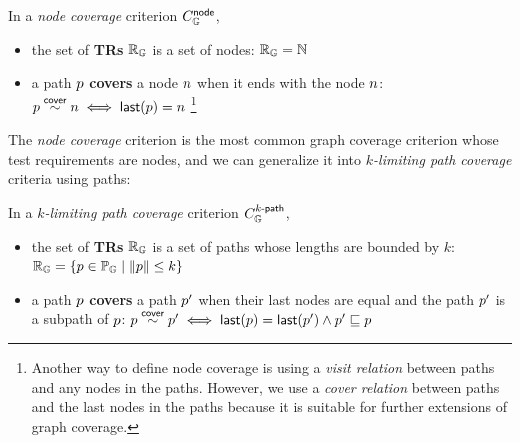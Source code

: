 
\begin{definition}\label{def:node-cov} In a \textit{node
  coverage} criterion $C_{\mathbb{G}}^{\textsf{node}}$,
  \begin{itemize}
    \item the set of \textbf{TRs} $\mathbb{R}_{\mathbb{G}}$ is a set of nodes:
      $  \mathbb{R}_{\mathbb{G}} = \mathbb{N} $
    \item a path $p$ \textbf{covers} a node $n$ when it ends with the
      node $n$:
      $  p \overset{\textsf{cover}}{\sim} n \iff \textsf{last}(p) = n $
      \footnote{
        Another way to define node coverage is using a \textit{visit relation}
        between paths and any nodes in the paths. However, we use a
        \textit{cover relation} between paths and the last nodes in the paths
        because it is suitable for further extensions of graph coverage.
      }
  \end{itemize}
\end{definition}


The \textit{node coverage} criterion is the most common graph coverage criterion
whose test requirements are nodes, and we can generalize it into
\textit{$k$-limiting path coverage} criteria using paths:


\begin{definition}\label{def:k-path-cov}
  In a \textit{$k$-limiting path coverage} criterion $C_{\mathbb{G}}^{{k}\textsf{-path}}$,
  \begin{itemize}
    \item the set of \textbf{TRs} $\mathbb{R}_{\mathbb{G}}$ is a set of
      paths whose lengths are bounded by $k$:
$
        \mathbb{R}_{\mathbb{G}} = \{ p \in \mathbb{P}_{\mathbb{G}} \mid \lVert{p}\rVert \leq k \}
$
    \item a path $p$ \textbf{covers} a path $p'$ when their last nodes are
      equal and the path $p'$ is a subpath of $p$:
$
        p \overset{\textsf{cover}}{\sim} p'
        \iff
        \textsf{last}(p) = \textsf{last}(p') \wedge p' \sqsubseteq p
$
  \end{itemize}
\end{definition}


